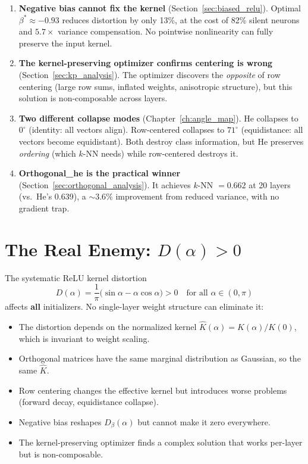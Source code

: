 \begin{enumerate}
  \item \textbf{Negative bias cannot fix the kernel}
        (Section~\ref{sec:biased_relu}).
        Optimal $\beta^* \approx -0.93$ reduces distortion by only 13\%,
        at the cost of 82\% silent neurons and $5.7\times$ variance
        compensation.  No pointwise nonlinearity can fully preserve
        the input kernel.

  \item \textbf{The kernel-preserving optimizer confirms centering is
        wrong} (Section~\ref{sec:kp_analysis}).
        The optimizer discovers the \emph{opposite} of row centering
        (large row sums, inflated weights, anisotropic structure), but
        this solution is non-composable across layers.

  \item \textbf{Two different collapse modes}
        (Chapter~\ref{ch:angle_map}).
        He collapses to $0^\circ$ (identity: all vectors align).
        Row-centered collapses to $71^\circ$ (equidistance: all
        vectors become equidistant).
        Both destroy class information, but He preserves
        \emph{ordering} (which $k$-NN needs) while row-centered
        destroys it.

  \item \textbf{Orthogonal\_he is the practical winner}
        (Section~\ref{sec:orthogonal_analysis}).
        It achieves $k$-NN $= 0.662$ at 20 layers (vs.\ He's 0.639),
        a $\sim\!3.6\%$ improvement from reduced variance, with no
        gradient trap.
\end{enumerate}

\section{The Real Enemy: $D(\alpha) > 0$}

The systematic ReLU kernel distortion
\[
  D(\alpha) = \frac{1}{\pi}\bigl(\sin\alpha - \alpha\cos\alpha\bigr) > 0
  \quad\text{for all } \alpha \in (0,\pi)
\]
affects \textbf{all} initializers.  No single-layer weight structure
can eliminate it:
\begin{itemize}
  \item The distortion depends on the normalized kernel
        $\hat{K}(\alpha) = K(\alpha)/K(0)$, which is invariant to
        weight scaling.
  \item Orthogonal matrices have the same marginal distribution as
        Gaussian, so the same $\hat{K}$.
  \item Row centering changes the effective kernel but introduces worse
        problems (forward decay, equidistance collapse).
  \item Negative bias reshapes $D_\beta(\alpha)$ but cannot make it
        zero everywhere.
  \item The kernel-preserving optimizer finds a complex solution that
        works per-layer but is non-composable.
\end{itemize}

